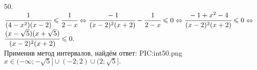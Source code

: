 50. $\cfrac{1}{(4-x^2)(x-2)}\leqslant\cfrac{1}{2-x} \Leftrightarrow\cfrac{-1}{(x-2)^2(x+2)}-\cfrac{1}{2-x}\leqslant0\Leftrightarrow
\cfrac{-1+x^2-4}{(x-2)^2(x+2)}\leqslant0\Leftrightarrow$\\$\cfrac{(x-\sqrt{5})(x+\sqrt{5})}{(x-2)^2(x+2)}\leqslant0.$\\ Применив метод интервалов, найдём ответ:
{{PIC:int50.png}}
$x\in(-\infty;-\sqrt{5}]\cup(-2;2)\cup(2;\sqrt{5}].$\\
